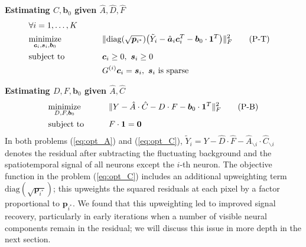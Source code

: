\documentclass[10pt,letterpaper]{article}
\begin{document}
{\textbf{Estimating $C, \bm{b}_0$ given $\hat{A}, \hat{D}, \hat{F}$}
\begin{alignat}{2}
& \forall i=1, \hdots, K\notag\\
&\underset{\bm{c}_i,\bm{s}_i, \bm{b}_0}{\text{minimize}} &\qquad& \|\text{diag}(\sqrt{\bm{p}_{i^*}}) \big(\tilde{Y}_i-\hat{\bm{a}}_i\bm{c}_i^T-  {\bm{b}}_0\cdot \bm{1}^T\big)\|_F^2 \label{eq:opt_C}\tag{P-T}\\
&\text{subject to} &&\bm{c}_i\geq 0, ~\bm{s}_i\geq 0\notag\\
&&&G^{(i)}\bm{c}_i = \bm{s}_i, ~ \bm{s}_i \text{ is sparse}\notag
\end{alignat}

\textbf{Estimating $D, F, {\bm{b}}_0$ given $\hat{A}, \hat{C}$ }
\begin{alignat}{2}
&\underset{D, F, \bm{b}_0}{\text{minimize}} &\qquad& \|Y-\hat{A}\cdot \hat{C} - D\cdot F- \bm{b}_0\cdot \bm{1}^T\|_F^2 \label{eq:opt_B}\tag{P-B}\\
&\text{subject to} && F\cdot \bm{1} = \bm{0}\notag \notag 
\end{alignat}
In both problems (\ref{eq:opt_A}) and (\ref{eq:opt_C}), $\tilde{Y}_i = Y-\hat{D}\cdot \hat{F} - \hat{A}_{\backslash i}\cdot \hat{C}_{\backslash i}$ denotes the residual after subtracting the fluctuating background and the spatiotemporal signal of all neurons except the $i$-th neuron. 
The objective function in the problem (\ref{eq:opt_C}) includes an additional upweighting term $\text{diag}(\sqrt{\bm{p}_{i^*}})$; this upweights the squared residuals at each pixel by a factor proportional to $\bm{p}_{i^*}$. We found that this upweighting led to improved signal recovery, particularly in early iterations when a number of visible neural components remain in the residual; we will discuss this issue in more depth in the next section. 



}
\end{document}
